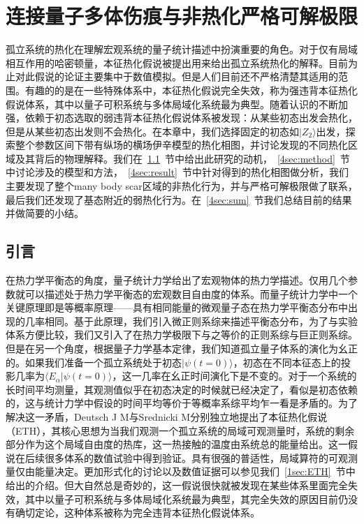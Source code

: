 \chapter{连接量子多体伤痕与非热化严格可解极限}\label{chap:ETH}

孤立系统的热化在理解宏观系统的量子统计描述中扮演重要的角色。对于仅有局域相互作用的哈密顿量，本征热化假说被提出用来给出孤立系统热化的解释。目前为止对此假说的论证主要集中于数值模拟。但是人们目前还不严格清楚其适用的范围。有趣的的是在一些特殊体系中，本征热化假说完全失效，称为强违背本征热化假说体系，其中以量子可积系统与多体局域化系统最为典型。随着认识的不断加强，依赖于初态选取的弱违背本征热化假说体系被发现：从某些初态出发会热化，但是从某些初态出发则不会热化。在本章中，我们选择固定的初态如$|Z_2\rangle$出发，探索整个参数区间下带有纵场的横场伊辛模型的热化相图，并讨论发现的不同热化区域及其背后的物理解释。我们在~\ref{4sec:intro}~节中给出此研究的动机，~\ref{4sec:method}~节中讨论涉及的模型和方法，~\ref{4sec:result}~节中针对得到的热化相图做分析，我们主要发现了整个many body scar区域的非热化行为，并与严格可解极限做了联系，最后我们还发现了基态附近的弱热化行为。在~\ref{4sec:sum}~节我们总结目前的结果并做简要的小结。

\section{引言}\label{4sec:intro}
在热力学平衡态的角度，量子统计力学给出了宏观物体的热力学描述。仅用几个参数就可以描述处于热力学平衡态的宏观数目自由度的体系。而量子统计力学中一个关键原理即是等概率原理——具有相同能量的微观量子态在热力学平衡态分布中出现的几率相同。基于此原理，我们引入微正则系综来描述平衡态分布，为了与实验体系方便比较，我们又引入了在热力学极限下与之等价的正则系综与巨正则系综。但是在另一个角度，根据量子力学基本定律，我们知道孤立量子体系的演化为幺正的。如果我们准备一个孤立系统处于初态$|\psi(t=0)\rangle$，初态在不同本征态上的投影几率为$\langle E_\alpha|\psi(t=0)\rangle$，这一几率在幺正时间演化下是不变的。对于一个系统的长时间平均测量，其观测值似乎在初态决定的时候就已经决定了，看似是初态依赖的，这与统计力学中假设的时间平均等价于等概率系综平均乍一看是矛盾的。为了解决这一矛盾，Deutsch J M\cite{Deutsch1991quantum}与Srednicki M\cite{Srednicki1994chaos}分别独立地提出了本征热化假说（ETH），其核心思想为当我们观测一个孤立系统的局域可观测量时，系统的剩余部分作为这个局域自由度的热库，这一热接触的温度由系统总的能量给出。这一假说在后续很多体系的数值试验中得到验证。具有很强的普适性，局域算符的可观测量仅由能量决定。更加形式化的讨论以及数值证据可以参见我们~\ref{1sec:ETH}~节中给出的介绍。但大自然总是奇妙的，这一假说很快就被发现在某些体系里面完全失效，其中以量子可积系统\cite{kinoshita2006quantum,Rigol2007Relaxation,Calabrese2011Quantum,essler2016quench,vidmar2016generalized}与多体局域化系统最为典型\cite{basko2006metal,Serbyn2013local,Huse2014Phenomenology}，其完全失效的原因目前仍没有确切定论，这种体系被称为完全违背本征热化假说体系。

